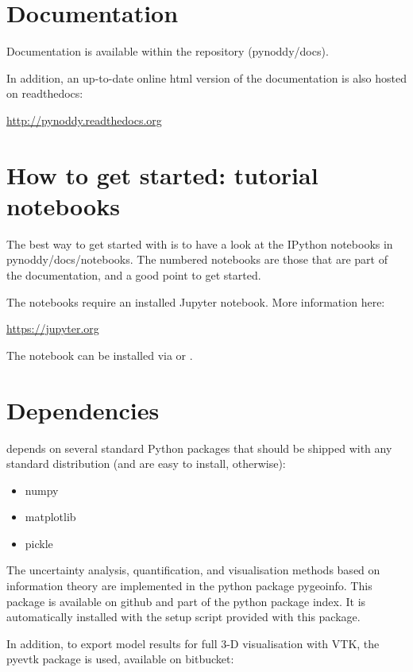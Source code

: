 \documentclass[a4paper,10pt,english]{sphinxmanual}
\begin{document}
\section{Documentation}
\label{readme:documentation}
Documentation is available within the  repository
(pynoddy/docs).

In addition, an up-to-date online html version of the documentation is
also hosted on readthedocs:

\href{http://pynoddy.readthedocs.org}{http://pynoddy.readthedocs.org}


\section{How to get started: tutorial notebooks}
\label{readme:how-to-get-started-tutorial-notebooks}
The best way to get started with  is to have a look at the
IPython notebooks in pynoddy/docs/notebooks. The numbered notebooks are
those that are part of the documentation, and a good point to get
started.

The notebooks require an installed Jupyter notebook. More information
here:

\href{https://jupyter.org}{https://jupyter.org}

The notebook can be installed via  or .


\section{Dependencies}
\label{readme:dependencies}
 depends on several standard Python packages that should be
shipped with any standard distribution (and are easy to install,
otherwise):
\begin{itemize}
\item {} 
numpy

\item {} 
matplotlib

\item {} 
pickle

\end{itemize}

The uncertainty analysis, quantification, and visualisation methods
based on information theory are implemented in the python package
pygeoinfo. This package is available on github and part of the python
package index. It is automatically installed with the setup script
provided with this package.

In addition, to export model results for full 3-D visualisation with
VTK, the pyevtk package is used, available on bitbucket:
\end{document}
